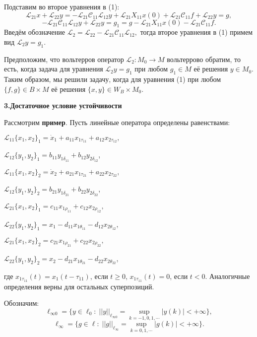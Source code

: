 Подставим во второе уравнения в (1):
$${\mathcal L}_{21} x+{\mathcal L}_{22} y =
-{\mathcal L}_{21} {\mathcal C}_{11} {\mathcal L}_{12} y+{\mathcal L}_{21} X_{11} x(0)+{\mathcal L}_{21} {\mathcal C}_{11} f+{\mathcal L}_{22} y=g,
$$
$$
- {\mathcal L}_{21} {\mathcal C}_{11} {\mathcal L}_{12} y+{\mathcal L}_{22} y=g_{1} =g- {\mathcal L}_{21} X_{11} x(0)-{\mathcal L}_{21} {\mathcal C}_{11} f.
$$
Введём обозначение ${\mathcal L}_2= {\mathcal L}_{22} -{\mathcal L}_{21} {\mathcal C}_{11} {\mathcal L}_{12} ,$ тогда второе уравнения в (1) примем вид ${\mathcal L}_2y=g_{1} .$

Предположим, что вольтерров оператор ${\mathcal L}_2:M_{0} \to M$ вольтеррово обратим, то есть, когда задача для уравнения ${\mathcal L}_2 y=g_{1} $ при любом $g_{1} \in M$ её решения $y\in M_{0} .$ Таким образом, мы решили задачу, когда для уравнения (1) при любом $\{ f,g\} \in B\times M $ её решения $\{ x,y\} \in W_{B}\times M_{0} .$


\smallskip \centerline{\bf 3.Достаточное условие устойчивости} \nopagebreak

Рассмотрим {\bf пример}. Пусть линейные оператора определены равенствами:

${\mathcal L}_{11}\{x_1,x_2\}_1 = \dot{x}_1 +
a_{11}x_{1\tau_{11}} + a_{12}x_{2\tau_{12}},$

${\mathcal L}_{12}\{y_1,y_2\}_1 = b_{11}y_{1\delta_{11}} + b_{12}y_{2\delta_{12}}$,


${\mathcal L}_{11}\{x_1,x_2\}_2 = \dot{x}_2 +
a_{21}x_{1\tau_{21}} + a_{22}x_{2\tau_{22}},$

${\mathcal L}_{12}\{y_1,y_2\}_2 = b_{21}y_{1\delta_{21}} + b_{22}y_{2\delta_{22}}$,


${\mathcal L}_{21}\{x_1,x_2\}_1 = c_{11}x_{1\rho_{11}} +
c_{12}x_{2\rho_{12}},$

${\mathcal L}_{22}\{y_1,y_2\}_1 = x_1 - d_{11}x_{1\theta_{11}} - d_{12}x_{2\theta_{12}}$,

${\mathcal L}_{21}\{x_1,x_2\}_2 = c_{21}x_{1\rho_{21}} +
c_{22}x_{2\rho_{22}},$

${\mathcal L}_{22}\{y_1,y_2\}_2 = x_2 - d_{21}x_{1\theta_{21}} - d_{22}x_{2\theta_{22}}$,

\noindent где $x_{1\tau_{11}}(t)=x_1(t-\tau_{11})$, если $t \geq 0$, $x_{1\tau_{11}}(t)=0$, если $t < 0$. Аналогичные определения верны
для остальных суперпозиций.

Обозначим:
$$
\ell_{\infty 0} =\{y\in \ell_{0}: \; ||y||_{\ell_{\infty 0}} = \mathop{\sup}\limits_{k=-1,0,1,\cdots} |y(k)| <+\infty \},
$$
$$
\ell_{\infty} =\{g\in \ell: \; ||g||_{\ell_{\infty}} = \mathop{\sup}\limits_{k=0,1,\cdots} |g(k)| <+\infty \}.
$$

